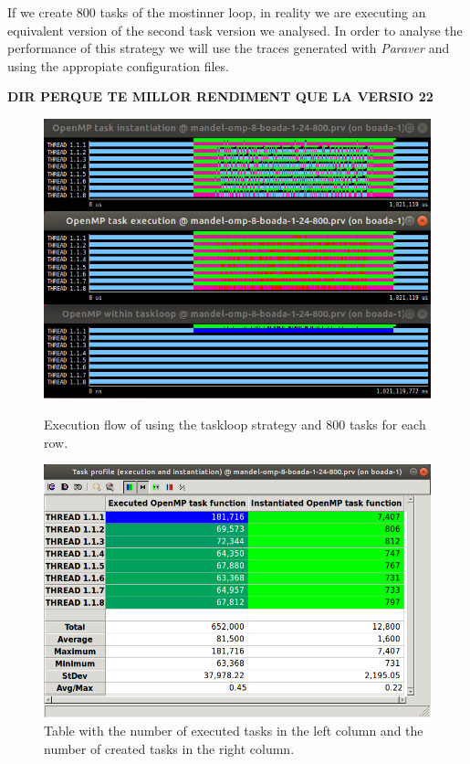\documentclass[12pt, a4paper]{article}
\begin{document}
If we create 800 tasks of the mostinner loop, in reality we are executing an equivalent version of the second task version we analysed. In order to analyse the performance of this strategy we will use the traces generated with \textit{Paraver} and using the appropiate configuration files.

\textbf{\large{\large{DIR PERQUE TE MILLOR RENDIMENT QUE LA VERSIO 22}}}

\begin{figure}[H]
\begin{minipage}[t]{0.48\linewidth}
  \centering
  \includegraphics[scale=0.35]{./S2_OMP_tasks_24_800}
  \caption{Execution flow of using the taskloop strategy and 800 tasks for each row.}
  \label{fig:S2_OMP_tasks_24_800}
\end{minipage}%
\hspace{0.5cm}
\begin{minipage}[t]{0.48\linewidth}
  \centering
  \includegraphics[scale=0.3]{./S2_OMP_tasks_24_800_table}
  \caption{Table with the number of executed tasks in the left column and the number of created tasks in the right column.}
  \label{fig:S2_OMP_tasks_24_800_table}
\end{minipage}
\end{figure}
\end{document}
